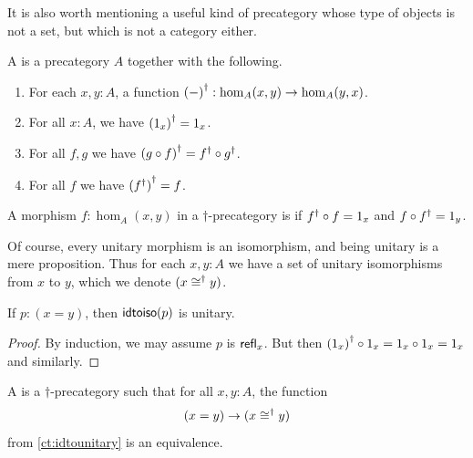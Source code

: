 It is also worth mentioning a useful kind of precategory whose type of objects is not a set, but which is not a category either.

\begin{defn}\label{ct:dagger-precategory}
  A 
  is a precategory $A$ together with the following.
  \begin{enumerate}
  \item For each $x,y:A$, a function ${(-)}^{\dagger}:\hom_A(x,y) \to \hom_A(y,x)$.
  \item For all $x:A$, we have ${(1_x)}^{\dagger} = 1_x$.
  \item For all $f,g$ we have ${(g\circ f)}^{\dagger} = {f}^{\dagger} \circ {g}^{\dagger}$.
  \item For all $f$ we have ${({f}^{\dagger})}^{\dagger} = f$.
  \end{enumerate}
\end{defn}

\begin{defn}\label{ct:unitary}
  A morphism $f:\hom_A(x,y)$ in a $\dagger$-precategory is 
  if ${f}^{\dagger} \circ f = 1_x$ and $f\circ {f}^{\dagger} = 1_y$.
\end{defn}

Of course, every unitary morphism is an isomorphism, and being unitary is a mere proposition.
Thus for each $x,y:A$ we have a set of unitary isomorphisms from $x$ to $y$, which we denote $(x\mathrel{\cong^\dagger} y)$.

\begin{lem}\label{ct:idtounitary}
  If $p:(x=y)$, then $\mathsf{idtoiso}(p)$ is unitary.
\end{lem}
\begin{proof}
  By induction, we may assume $p$ is $\mathsf{refl}_{x}$.
  But then ${(1_x)}^{\dagger} \circ 1_x = 1_x\circ 1_x = 1_x$ and similarly.
\end{proof}

\begin{defn}\label{ct:dagger-category}
  A 
  is a $\dagger$-precategory such that for all $x,y:A$, the function
  \[ (x=y) \to (x \mathrel{\cong^\dagger} y) \]
  from \cref{ct:idtounitary} is an equivalence.
\end{defn}

